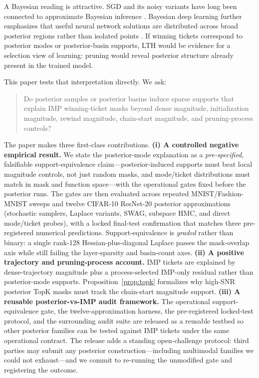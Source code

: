 \documentclass{article}
\begin{document}
A Bayesian reading is attractive. SGD and its noisy variants have long been
connected to approximate Bayesian inference \citep{welling2011sgld,
mandt2017sgd}. Bayesian deep learning further emphasizes that useful neural
network solutions are distributed across broad posterior regions rather than
isolated points \citep{wilson2020bayesian, izmailov2021posteriors}. If winning
tickets correspond to posterior modes or posterior-basin supports, LTH would be
evidence for a selection view of learning: pruning would reveal posterior
structure already present in the trained model.

This paper tests that interpretation directly. We ask:

\begin{quote}
Do posterior samples or posterior basins induce sparse supports that explain IMP
winning-ticket masks beyond dense magnitude, initialization magnitude, rewind
magnitude, chain-start magnitude, and pruning-process controls?
\end{quote}

The paper makes three first-class contributions.
\textbf{(i) A controlled negative empirical result.} We state the
posterior-mode explanation as a \emph{pre-specified}, falsifiable
support-equivalence claim---posterior-induced supports must beat local
magnitude controls, not just random masks, and mode/ticket distributions must
match in mask and function space---with the operational gates fixed before
the posterior runs. The gates are then evaluated across repeated
MNIST/Fashion-MNIST sweeps and twelve CIFAR-10 ResNet-20 posterior
approximations (stochastic samplers, Laplace variants, SWAG, subspace HMC,
and direct mode/ticket probes), with a locked final-test confirmation that
matches three pre-registered numerical predictions. Support-equivalence is
\emph{graded} rather than binary: a single rank-128 Hessian-plus-diagonal
Laplace passes the mask-overlap axis while still failing the layer-sparsity
and basin-count axes.
\textbf{(ii) A positive trajectory and pruning-process account.} IMP
tickets are explained by dense-trajectory magnitude plus a process-selected
IMP-only residual rather than posterior-mode supports.
Proposition~\ref{prop:topk} formalizes why high-SNR posterior TopK masks must
track the chain-start magnitude support.
\textbf{(iii) A reusable posterior-vs-IMP audit framework.} The operational
support-equivalence gate, the twelve-approximation harness, the
pre-registered locked-test protocol, and the surrounding audit suite are
released as a reusable testbed so other posterior families can be tested
against IMP tickets under the same operational contract. The release adds
a standing open-challenge protocol: third parties may submit any posterior
construction---including multimodal families we could not exhaust---and we
commit to re-running the unmodified gate and registering the outcome.
\end{document}
